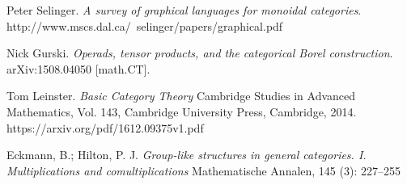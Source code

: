 \documentclass{amsart} %
\begin{document}
\begin{thebibliography}{9}

Peter Selinger.
\textit{A survey of graphical languages for monoidal categories}.
http://www.mscs.dal.ca/~selinger/papers/graphical.pdf

Nick Gurski. 
\textit{Operads, tensor products, and the categorical Borel construction}. 
 arXiv:1508.04050 [math.CT].

Tom Leinster.
\textit{Basic Category Theory}
Cambridge Studies in Advanced Mathematics, Vol. 143, Cambridge University Press, Cambridge, 2014.
https://arxiv.org/pdf/1612.09375v1.pdf

Eckmann, B.; Hilton, P. J. 
\textit{Group-like structures in general categories. I. Multiplications and comultiplications}
Mathematische Annalen, 145 (3): 227–255

\end{thebibliography}
\end{document}
